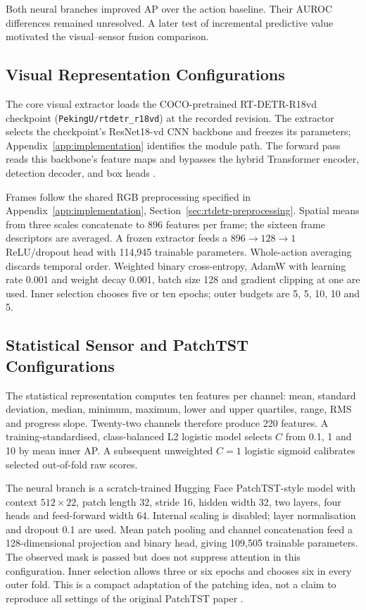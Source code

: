 Both neural branches improved AP over the action baseline. Their AUROC differences
remained unresolved. A later test of incremental predictive value motivated the
visual--sensor fusion comparison.

\subsection{Visual Representation Configurations}
The core visual extractor loads the COCO-pretrained RT-DETR-R18vd checkpoint
(\texttt{PekingU/rtdetr\_r18vd}) at the recorded revision. The extractor selects the checkpoint's ResNet18-vd CNN backbone and freezes its
parameters; Appendix~\ref{app:implementation} identifies the module path. The forward pass reads this
backbone's feature maps and bypasses the hybrid Transformer encoder, detection decoder,
and box heads \parencite{Zhao2024RTDETR}.

Frames follow the shared RGB preprocessing specified in
Appendix~\ref{app:implementation}, Section~\ref{sec:rtdetr-preprocessing}. Spatial means
from three scales concatenate to 896 features per frame; the sixteen frame descriptors
are averaged. A frozen extractor feeds a $896\rightarrow128\rightarrow1$ ReLU/dropout
head with 114,945 trainable parameters. Whole-action averaging discards temporal order.
Weighted binary cross-entropy, AdamW with learning rate 0.001 and weight decay 0.001,
batch size 128 and gradient clipping at one are used. Inner selection chooses five or
ten epochs; outer budgets are 5, 5, 10, 10 and 5.

\subsection{Statistical Sensor and PatchTST Configurations}
The statistical representation computes ten features per channel: mean, standard
deviation, median, minimum, maximum, lower and upper quartiles, range, RMS and progress
slope. Twenty-two channels therefore produce 220 features. A training-standardised,
class-balanced L2 logistic model selects $C$ from 0.1, 1 and 10 by mean inner AP. A
subsequent unweighted $C=1$ logistic sigmoid calibrates selected out-of-fold raw scores.

The neural branch is a scratch-trained Hugging Face PatchTST-style model with context
$512\times22$, patch length 32, stride 16, hidden width 32, two layers, four heads and
feed-forward width 64. Internal scaling is disabled; layer normalisation and dropout 0.1
are used. Mean patch pooling and channel concatenation feed a 128-dimensional projection
and binary head, giving 109,505 trainable parameters. The observed mask is passed but
does not suppress attention in this configuration. Inner selection allows three or six
epochs and chooses six in every outer fold. This is a compact adaptation of the patching
idea, not a claim to reproduce all settings of the original PatchTST paper
\parencite{Nie2023PatchTST}.


